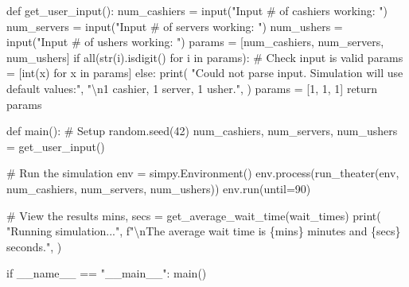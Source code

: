 \documentclass[
  11pt,
]{article}
\newenvironment{Shaded}{\begin{snugshade}}{\end{snugshade}}
\newcommand{\BuiltInTok}[1]{\textcolor[rgb]{0.00,0.23,0.31}{#1}}
\newcommand{\CharTok}[1]{\textcolor[rgb]{0.13,0.47,0.30}{#1}}
\newcommand{\CommentTok}[1]{\textcolor[rgb]{0.37,0.37,0.37}{#1}}
\newcommand{\ControlFlowTok}[1]{\textcolor[rgb]{0.00,0.23,0.31}{#1}}
\newcommand{\DecValTok}[1]{\textcolor[rgb]{0.68,0.00,0.00}{#1}}
\newcommand{\KeywordTok}[1]{\textcolor[rgb]{0.00,0.23,0.31}{#1}}
\newcommand{\NormalTok}[1]{\textcolor[rgb]{0.00,0.23,0.31}{#1}}
\newcommand{\OperatorTok}[1]{\textcolor[rgb]{0.37,0.37,0.37}{#1}}
\newcommand{\SpecialCharTok}[1]{\textcolor[rgb]{0.37,0.37,0.37}{#1}}
\newcommand{\SpecialStringTok}[1]{\textcolor[rgb]{0.13,0.47,0.30}{#1}}
\newcommand{\StringTok}[1]{\textcolor[rgb]{0.13,0.47,0.30}{#1}}
\newcommand{\VariableTok}[1]{\textcolor[rgb]{0.07,0.07,0.07}{#1}}
\begin{document}
\begin{Shaded}
\begin{Highlighting}[]
\KeywordTok{def}\NormalTok{ get\_user\_input():}
\NormalTok{    num\_cashiers }\OperatorTok{=} \BuiltInTok{input}\NormalTok{(}\StringTok{"Input \# of cashiers working: "}\NormalTok{)}
\NormalTok{    num\_servers }\OperatorTok{=} \BuiltInTok{input}\NormalTok{(}\StringTok{"Input \# of servers working: "}\NormalTok{)}
\NormalTok{    num\_ushers }\OperatorTok{=} \BuiltInTok{input}\NormalTok{(}\StringTok{"Input \# of ushers working: "}\NormalTok{)}
\NormalTok{    params }\OperatorTok{=}\NormalTok{ [num\_cashiers, num\_servers, num\_ushers]}
    \ControlFlowTok{if} \BuiltInTok{all}\NormalTok{(}\BuiltInTok{str}\NormalTok{(i).isdigit() }\ControlFlowTok{for}\NormalTok{ i }\KeywordTok{in}\NormalTok{ params):  }\CommentTok{\# Check input is valid}
\NormalTok{        params }\OperatorTok{=}\NormalTok{ [}\BuiltInTok{int}\NormalTok{(x) }\ControlFlowTok{for}\NormalTok{ x }\KeywordTok{in}\NormalTok{ params]}
    \ControlFlowTok{else}\NormalTok{:}
        \BuiltInTok{print}\NormalTok{(}
            \StringTok{"Could not parse input. Simulation will use default values:"}\NormalTok{,}
            \StringTok{"}\CharTok{\textbackslash{}n}\StringTok{1 cashier, 1 server, 1 usher."}\NormalTok{,}
\NormalTok{        )}
\NormalTok{        params }\OperatorTok{=}\NormalTok{ [}\DecValTok{1}\NormalTok{, }\DecValTok{1}\NormalTok{, }\DecValTok{1}\NormalTok{]}
    \ControlFlowTok{return}\NormalTok{ params}


\KeywordTok{def}\NormalTok{ main():}
    \CommentTok{\# Setup}
\NormalTok{    random.seed(}\DecValTok{42}\NormalTok{)}
\NormalTok{    num\_cashiers, num\_servers, num\_ushers }\OperatorTok{=}\NormalTok{ get\_user\_input()}

    \CommentTok{\# Run the simulation}
\NormalTok{    env }\OperatorTok{=}\NormalTok{ simpy.Environment()}
\NormalTok{    env.process(run\_theater(env, num\_cashiers, num\_servers, num\_ushers))}
\NormalTok{    env.run(until}\OperatorTok{=}\DecValTok{90}\NormalTok{)}

    \CommentTok{\# View the results}
\NormalTok{    mins, secs }\OperatorTok{=}\NormalTok{ get\_average\_wait\_time(wait\_times)}
    \BuiltInTok{print}\NormalTok{(}
        \StringTok{"Running simulation..."}\NormalTok{,}
        \SpecialStringTok{f"}\CharTok{\textbackslash{}n}\SpecialStringTok{The average wait time is }\SpecialCharTok{\{}\NormalTok{mins}\SpecialCharTok{\}}\SpecialStringTok{ minutes and }\SpecialCharTok{\{}\NormalTok{secs}\SpecialCharTok{\}}\SpecialStringTok{ seconds."}\NormalTok{,}
\NormalTok{    )}


\ControlFlowTok{if} \VariableTok{\_\_name\_\_} \OperatorTok{==} \StringTok{"\_\_main\_\_"}\NormalTok{:}
\NormalTok{    main()}
\end{Highlighting}
\end{Shaded}
\end{document}
